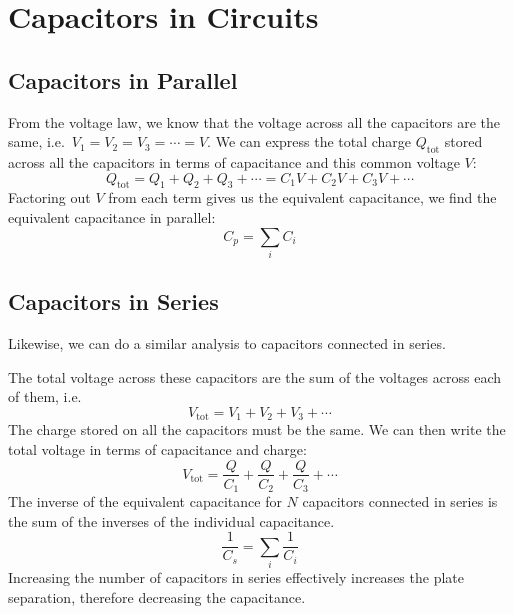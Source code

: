 \section{Capacitors in Circuits}

\subsection{Capacitors in Parallel}

\begin{figure}[ht]
  \centering
\end{figure}
From the voltage law, we know that the voltage across all the capacitors are
the same, i.e.\ $V_1=V_2=V_3=\cdots=V$. We can express the total charge
$Q_\text{tot}$ stored across all the capacitors in terms of capacitance and this
common voltage $V$: 
\begin{equation}
  Q_\text{tot}=Q_1+Q_2+Q_3+\cdots=C_1V+C_2V+C_3V+\cdots
\end{equation}  
Factoring out $V$ from each term gives us the equivalent capacitance, we find
the equivalent capacitance in parallel:
\begin{equation}
  \boxed{
    C_p=\sum_i C_i
  }
\end{equation}


\subsection{Capacitors in Series}
Likewise, we can do a similar analysis to capacitors connected in series.
\begin{figure}[ht]
  \centering
\end{figure}
The total voltage across these capacitors are the sum of the voltages across
each of them, i.e.\
\begin{equation}
  V_\text{tot}=V_1+V_2+V_3+\cdots
\end{equation}
The charge stored on all the capacitors must be the same. We can then write the
total voltage in terms of capacitance and charge:
\begin{equation}
  V_\text{tot}=\frac Q{C_1}+\frac Q{C_2}+\frac Q{C_3}+\cdots
\end{equation}
The inverse of the equivalent capacitance for $N$ capacitors connected in
series is the sum of the inverses of the individual capacitance.
\begin{equation}
  \boxed{
    \frac1{C_s}=\sum_i\frac1{C_i}
  }
\end{equation}
Increasing the number of capacitors in series effectively increases the plate
separation, therefore decreasing the capacitance.
  
